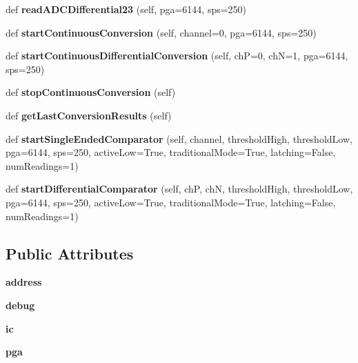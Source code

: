\begin{DoxyCompactItemize}
def {\bfseries read\+A\+D\+C\+Differential23} (self, pga=6144, sps=250)
\item 
\mbox{\label{classAdafruit__ADS1x15_1_1ADS1x15_a9514f4d5ef72ee2bb0b8b9be761a863d}} 
def {\bfseries start\+Continuous\+Conversion} (self, channel=0, pga=6144, sps=250)
\item 
\mbox{\label{classAdafruit__ADS1x15_1_1ADS1x15_a7c0caf702a19de8ff2c0ed231ee68bc4}} 
def {\bfseries start\+Continuous\+Differential\+Conversion} (self, chP=0, chN=1, pga=6144, sps=250)
\item 
\mbox{\label{classAdafruit__ADS1x15_1_1ADS1x15_a68fcd9270c13a589ce82786452fb6a25}} 
def {\bfseries stop\+Continuous\+Conversion} (self)
\item 
\mbox{\label{classAdafruit__ADS1x15_1_1ADS1x15_a8be2b5fb5dfe16a03642caa1626702a1}} 
def {\bfseries get\+Last\+Conversion\+Results} (self)
\item 
\mbox{\label{classAdafruit__ADS1x15_1_1ADS1x15_a2098e937cb97e9694d530f6782c91b5b}} 
def {\bfseries start\+Single\+Ended\+Comparator} (self, channel, threshold\+High, threshold\+Low, pga=6144, sps=250, active\+Low=True, traditional\+Mode=True, latching=False, num\+Readings=1)
\item 
\mbox{\label{classAdafruit__ADS1x15_1_1ADS1x15_a9f5fb0203e2d06e14202544c8041d3fd}} 
def {\bfseries start\+Differential\+Comparator} (self, chP, chN, threshold\+High, threshold\+Low, pga=6144, sps=250, active\+Low=True, traditional\+Mode=True, latching=False, num\+Readings=1)
\end{DoxyCompactItemize}
\subsection*{Public Attributes}
\begin{DoxyCompactItemize}
\item 
\mbox{\label{classAdafruit__ADS1x15_1_1ADS1x15_a39852454ef6e288ffa745a1f614db6c7}} 
{\bfseries address}
\item 
\mbox{\label{classAdafruit__ADS1x15_1_1ADS1x15_ad67b1af2c30d8e5ce9c8358ea442dc4e}} 
{\bfseries debug}
\item 
\mbox{\label{classAdafruit__ADS1x15_1_1ADS1x15_a6c63a9d31177d7d7cbdb37ac073be6bb}} 
{\bfseries ic}
\item 
\mbox{\label{classAdafruit__ADS1x15_1_1ADS1x15_a4f813ece115869b0618512b018df6972}} 
{\bfseries pga}
\end{DoxyCompactItemize}
